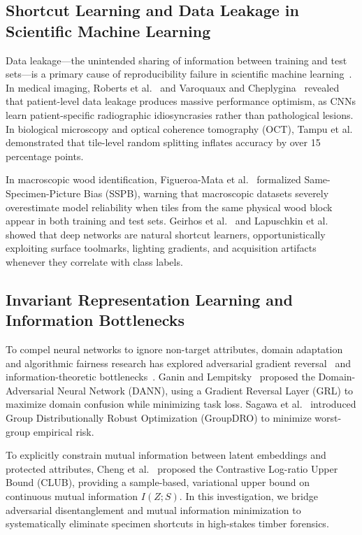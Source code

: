 \documentclass[a4paper,fleqn]{cas-sc}
\begin{document}
\subsection{Shortcut Learning and Data Leakage in Scientific Machine Learning}
Data leakage—the unintended sharing of information between training and test sets—is a primary cause of reproducibility failure in scientific machine learning~\cite{kaufman2012,kapoor2023}. In medical imaging, Roberts et al.~\cite{roberts2021} and Varoquaux and Cheplygina~\cite{varoquaux2022} revealed that patient-level data leakage produces massive performance optimism, as CNNs learn patient-specific radiographic idiosyncrasies rather than pathological lesions. In biological microscopy and optical coherence tomography (OCT), Tampu et al.~\cite{tampu2022} demonstrated that tile-level random splitting inflates accuracy by over 15 percentage points. 

In macroscopic wood identification, Figueroa-Mata et al.~\cite{figueroamata2022} formalized Same-Specimen-Picture Bias (SSPB), warning that macroscopic datasets severely overestimate model reliability when tiles from the same physical wood block appear in both training and test sets. Geirhos et al.~\cite{geirhos2020} and Lapuschkin et al.~\cite{lapuschkin2019} showed that deep networks are natural shortcut learners, opportunistically exploiting surface toolmarks, lighting gradients, and acquisition artifacts whenever they correlate with class labels.

\subsection{Invariant Representation Learning and Information Bottlenecks}
To compel neural networks to ignore non-target attributes, domain adaptation and algorithmic fairness research has explored adversarial gradient reversal~\cite{ganin2015dann,long2018cdan} and information-theoretic bottlenecks~\cite{cheng2020club,belghazi2018mine}. Ganin and Lempitsky~\cite{ganin2015dann} proposed the Domain-Adversarial Neural Network (DANN), using a Gradient Reversal Layer (GRL) to maximize domain confusion while minimizing task loss. Sagawa et al.~\cite{sagawa2020groupdro} introduced Group Distributionally Robust Optimization (GroupDRO) to minimize worst-group empirical risk. 

To explicitly constrain mutual information between latent embeddings and protected attributes, Cheng et al.~\cite{cheng2020club} proposed the Contrastive Log-ratio Upper Bound (CLUB), providing a sample-based, variational upper bound on continuous mutual information $I(Z; S)$. In this investigation, we bridge adversarial disentanglement and mutual information minimization to systematically eliminate specimen shortcuts in high-stakes timber forensics.
\end{document}
